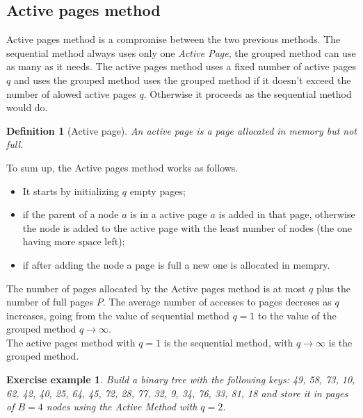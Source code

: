 \documentclass{report}
\newtheorem{defin}{Definition}[chapter]
\newtheorem{es}{Exercise example}[chapter]
\begin{document}
\subsection{Active pages method}
Active pages method is a compromise between the two previous methods. The sequential method always uses only one \textit{Active Page}, the grouped method can use as many as it needs. The active pages method uses a fixed number of active pages \(q\) and uses the grouped method uses the grouped method if it doesn't exceed the number of alowed active pages \(q\). Otherwise it proceeds as the sequential method would do.
\begin{defin}[Active page]
    An active page is a page allocated in memory but not full.
\end{defin}
To sum up, the Active pages method works as follows.
\begin{itemize}
    \item It starts by initializing \(q\) empty pages;
    \item if the parent of a node \(a\) is in a active page \(a\) is added in that page, otherwise the node is added to the active page with the least number of nodes (the one having more space left);
    \item if after adding the node a page is full a new one is allocated in mempry.
\end{itemize}
The number of pages allocated by the Active pages method is at most \(q\) plus the number of full pages \(P\). The average number of accesses to pages decreses as \(q\) increases, going from the value of sequential method \(q=1\) to the value of the grouped method \(q \to \infty\).
\\ The active pages method with \(q=1\) is the sequential method, with \(q \to \infty\) is the grouped method.
\begin{es}
    Build a binary tree with the following keys: 49, 58, 73, 10, 62, 42, 40, 25, 64, 45, 72, 28, 77, 32, 9, 34, 76, 33, 81, 18 and store it in pages of \(B=4\) nodes using the Active Method with \(q=2\). 
\end{es}
\end{document}
